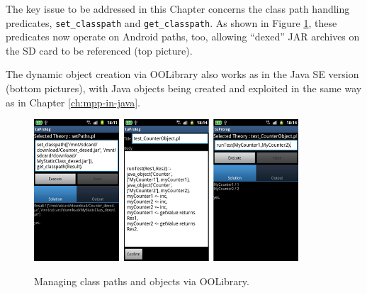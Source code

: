 The key issue to be addressed in this Chapter concerns the class path handling predicates, \texttt{set\_classpath} and \texttt{get\_classpath}.
As shown in Figure \ref{fig:android12}, these predicates now operate on Android paths, too, allowing ``dexed'' JAR archives on the SD card to be referenced (top picture).

The dynamic object creation via OOLibrary also works as in the Java SE version (bottom pictures), with Java objects being created and exploited in the same way as in Chapter \ref{ch:mpp-in-java}.
%
\begin{figure}
\centering
  \includegraphics[height=200px]{images/android12.png}~\includegraphics[height=200px]{images/android13.png}
  \caption{Managing class paths and objects via OOLibrary.}\label{fig:android12}
\end{figure}



